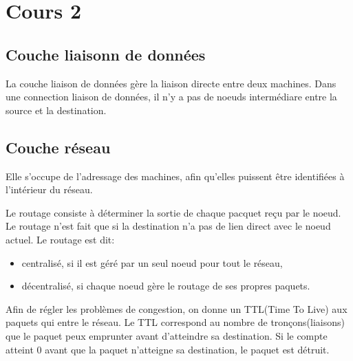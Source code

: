 \section{Cours 2}
\subsection{Couche liaisonn de données}
La couche liaison de données gère la liaison directe entre deux machines.
Dans une connection liaison de données, il n'y a pas de noeuds intermédiare entre la source et la destination.

\subsection{Couche réseau}
Elle s'occupe de l'adressage des machines, afin qu'elles puissent être identifiées à l'intérieur du réseau.

Le routage consiste à déterminer la sortie de chaque pacquet reçu par le noeud.
Le routage n'est fait que si la destination n'a pas de lien direct avec le noeud actuel.
Le routage est dit:
\begin{itemize}
	\item centralisé, si il est géré par un seul noeud pour tout le réseau,
	\item décentralisé, si chaque noeud gère le routage de ses propres paquets.
\end{itemize}

Afin de régler les problèmes de congestion, on donne un TTL(Time To Live) aux paquets qui entre le réseau.
Le TTL correspond au nombre de tronçons(liaisons) que le paquet peux emprunter avant d'atteindre sa destination.
Si le compte atteint 0 avant que la paquet n'atteigne sa destination, le paquet est détruit.
